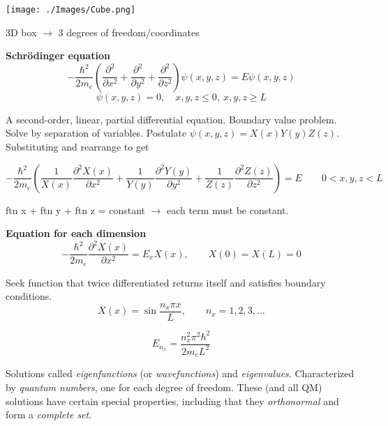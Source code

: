 \documentclass[11pt]{article}
\begin{document}
\begin{center}
\begin{center}
\texttt{[image: ./Images/Cube.png]}
\end{center}
\end{center}

3D box \(\rightarrow\) 3 degrees of freedom/coordinates

\textbf{Schr\"{o}dinger equation}
\begin{equation}
-\frac{\hbar^2}{2m_e} \left ( \frac{\partial^2 }{\partial x^2} + \frac{\partial^2 }{\partial y^2} + \frac{\partial^2 }{\partial z^2} \right ) \psi(x,y,z) = E \psi(x,y,z)
\end{equation}
\begin{equation}
\psi(x,y,z) = 0, \quad x,y,z \leq 0,\ x,y,z \geq L
\end{equation}

A second-order, linear, partial differential equation.  Boundary value problem. Solve by separation of variables.  Postulate \(\psi(x,y,z) = X(x)Y(y)Z(z)\). Substituting and rearrange to get

\begin{equation}
-\frac{\hbar^2}{2m_e} \left (\frac{1}{X(x)}\frac{\partial^2 X(x)}{\partial x^2} + \frac{1}{Y(y)}\frac{\partial^2 Y(y)}{\partial y^2} + \frac{1}{Z(z)}\frac{\partial^2 Z(z)}{\partial z^2} \right ) = E \qquad 0 < x,y,z <L
\end{equation}

ftn x + ftn y + ftn z = constant \(\rightarrow\) each term must be constant.

\textbf{Equation for each dimension}
\begin{equation}
-\frac{\hbar^2}{2m_e}\frac{\partial^2 X(x)}{\partial x^2} = E_x X(x), \qquad X(0)=X(L) = 0
\end{equation}

Seek function that twice differentiated returns itself and satisfies boundary conditions.
\begin{equation}
X(x) = \sin\frac{n_x\pi x}{L},\qquad n_x = 1,2,3,\ldots
\end{equation}

\begin{equation}
E_{n_x} = \frac{n_x^2\pi^2\hbar^2}{2 m_e L^2}
\end{equation}

Solutions called \emph{eigenfunctions} (or \emph{wavefunctions}) and \emph{eigenvalues}.  Characterized
by \emph{quantum numbers}, one for each degree of freedom.  These (and all QM) solutions have
certain special properties, including that they \emph{orthonormal} and form a \emph{complete set}.
\end{document}
